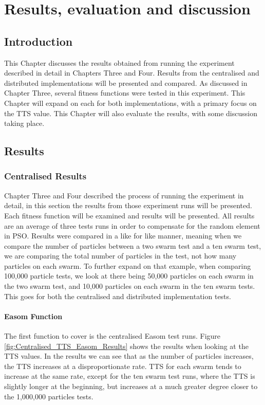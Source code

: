 \documentclass[oneside,12pt]{book}
\begin{document}
\chapter{Results, evaluation and discussion}
\section{Introduction}
This Chapter discusses the results obtained from running the experiment described in detail in Chapters Three and Four. Results from the centralised and distributed implementations will be presented and compared. As discussed in Chapter Three, several fitness functions were tested in this experiment. This Chapter will expand on each for both implementations, with a primary focus on the TTS value. This Chapter will also evaluate the results, with some discussion taking place. 

\section{Results}
\subsection{Centralised Results}
Chapter Three and Four described the process of running the experiment in detail, in this section the results from those experiment runs will be presented. Each fitness function will be examined and results will be presented. All results are an average of three tests runs in order to compensate for the random element in PSO. Results were compared in a like for like manner, meaning when we compare the number of particles between a two swarm test and a ten swarm test, we are comparing the total number of particles in the test, not how many particles on each swarm. To further expand on that example, when comparing 100,000 particle tests, we look at there being 50,000 particles on each swarm in the two swarm test, and 10,000 particles on each swarm in the ten swarm tests. This goes for both the centralised and distributed implementation tests. 

\subsubsection{Easom Function}
The first function to cover is the centralised Easom test runs. Figure \ref{fig:Centralised_TTS_Easom_Results} shows the results when looking at the TTS values. In the results we can see that as the number of particles increases, the TTS increases at a disproportionate rate. TTS for each swarm tends to increase at the same rate, except for the ten swarm test runs, where the TTS is slightly longer at the beginning, but increases at a much greater degree closer to the 1,000,000 particles tests.
\end{document}
